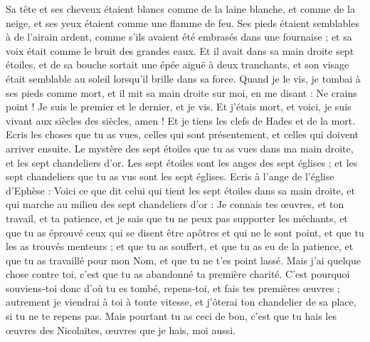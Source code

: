 \begin{multicols}{2}
Sa tête et ses cheveux étaient blancs comme de la laine blanche, et comme de la neige, et ses yeux étaient comme une flamme de feu.
Ses pieds étaient semblables à de l'airain ardent, comme s'ils avaient été embrasés dans une fournaise ; et sa voix était comme le bruit des grandes eaux.
Et il avait dans sa main droite sept étoiles, et de sa bouche sortait une épée aiguë à deux tranchants, et son visage était semblable au soleil lorsqu'il brille dans sa force.
Quand je le vis, je tombai à ses pieds comme mort, et il mit sa main droite sur moi, en me disant : Ne crains point !
Je suis le premier et le dernier, et je vis. Et j'étais mort, et voici, je suis vivant aux siècles des siècles, amen ! Et je tiens les clefs de Hades et de la mort.
Ecris les choses que tu as vues, celles qui sont présentement, et celles qui doivent arriver ensuite.
Le mystère des sept étoiles que tu as vues dans ma main droite, et les sept chandeliers d'or. Les sept étoiles sont les anges des sept églises ; et les sept chandeliers que tu as vus sont les sept églises.
\VerseOne{}Ecris à l'ange de l'église d'Ephèse : Voici ce que dit celui qui tient les sept étoiles dans sa main droite, et qui marche au milieu des sept chandeliers d'or :
Je connais tes œuvres, et ton travail, et ta patience, et je sais que tu ne peux pas supporter les méchants, et que tu as éprouvé ceux qui se disent être apôtres et qui ne le sont point, et que tu les as trouvés menteurs ;
et que tu as souffert, et que tu as eu de la patience, et que tu as travaillé pour mon Nom, et que tu ne t'es point lassé.
Mais j'ai quelque chose contre toi, c'est que tu as abandonné ta première charité.
C'est pourquoi souviens-toi donc d'où tu es tombé, repens-toi, et fais tes premières œuvres ; autrement je viendrai à toi à toute vitesse, et j'ôterai ton chandelier de sa place, si tu ne te repens pas.
Mais pourtant tu as ceci de bon, c'est que tu hais les œuvres des Nicolaïtes, œuvres que je hais, moi aussi.

\end{multicols}
